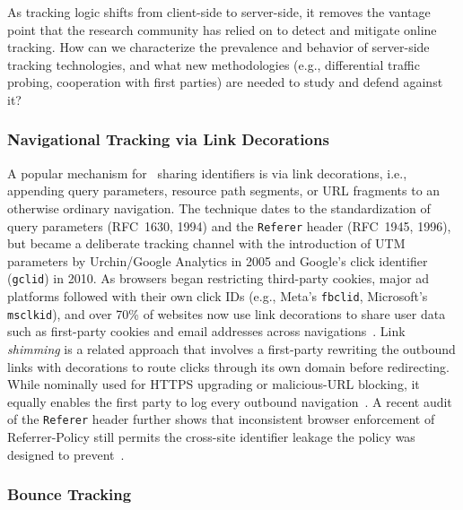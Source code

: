 \begin{opbox}
As tracking logic shifts from client-side to server-side, it removes the vantage point that the research community has relied on to detect and mitigate online tracking. How can we characterize the prevalence and behavior of server-side tracking technologies, and what new methodologies (e.g., differential traffic probing, cooperation with first parties) are needed to study and defend against it?
\end{opbox}



\subsubsection{Navigational Tracking via Link Decorations}
\label{sec:stateful-techniques-link-decorations}

A popular mechanism for \symSharing\ sharing identifiers is via link decorations, i.e., appending query parameters, resource path segments, or URL fragments to an otherwise ordinary navigation.
%
The technique dates to the standardization of query parameters (RFC~1630, 1994) and the \texttt{Referer} header (RFC~1945, 1996), but became a deliberate tracking channel with the introduction of UTM parameters by Urchin/Google Analytics in 2005 and Google's click identifier (\texttt{gclid}) in 2010.
%
As browsers began restricting third-party cookies, major ad platforms followed with their own click IDs (e.g., Meta's \texttt{fbclid}, Microsoft's \texttt{msclkid}), and over 70\% of websites now use link decorations to share user data such as first-party cookies and email addresses across navigations~\cite{munirPURLSafeEffective2024,koopInDepthEvaluationRedirect2020}.
%
Link \textit{shimming} is a related approach that involves a first-party rewriting the outbound links with decorations to route clicks through its own domain before redirecting.
%
While nominally used for HTTPS upgrading or malicious-URL blocking, it equally enables the first party to log every outbound navigation~\cite{liShimShimmenyEvaluating2020}.
%
A recent audit of the \texttt{Referer} header further shows that inconsistent browser enforcement of Referrer-Policy still permits the cross-site identifier leakage the policy was designed to prevent~\cite{zagiReferrerPolicyImplementation2025}.


\subsubsection{Bounce Tracking}
\label{sec:stateful-techniques-bounce-tracking}

